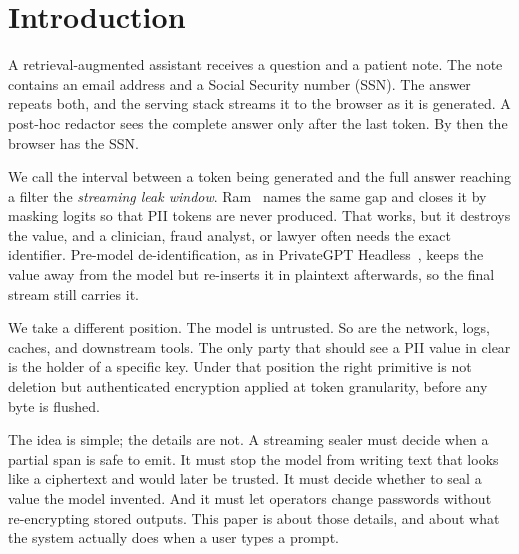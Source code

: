 \documentclass[conference,compsoc]{IEEEtran}
\begin{document}
\section{Introduction}
\label{sec:intro}

A retrieval-augmented assistant receives a question and a patient note. The note contains an email address and a Social Security number (SSN). The answer repeats both, and the serving stack streams it to the browser as it is generated. A post-hoc redactor sees the complete answer only after the last token. By then the browser has the SSN.

We call the interval between a token being generated and the full answer reaching a filter the \emph{streaming leak window}. Ram~\cite{ram2025constrained} names the same gap and closes it by masking logits so that PII tokens are never produced. That works, but it destroys the value, and a clinician, fraud analyst, or lawyer often needs the exact identifier. Pre-model de-identification, as in PrivateGPT Headless~\cite{privategpt}, keeps the value away from the model but re-inserts it in plaintext afterwards, so the final stream still carries it.

We take a different position. The model is untrusted. So are the network, logs, caches, and downstream tools. The only party that should see a PII value in clear is the holder of a specific key. Under that position the right primitive is not deletion but authenticated encryption applied at token granularity, before any byte is flushed.

The idea is simple; the details are not. A streaming sealer must decide when a partial span is safe to emit. It must stop the model from writing text that looks like a ciphertext and would later be trusted. It must decide whether to seal a value the model invented. And it must let operators change passwords without re-encrypting stored outputs. This paper is about those details, and about what the system actually does when a user types a prompt.
\end{document}
